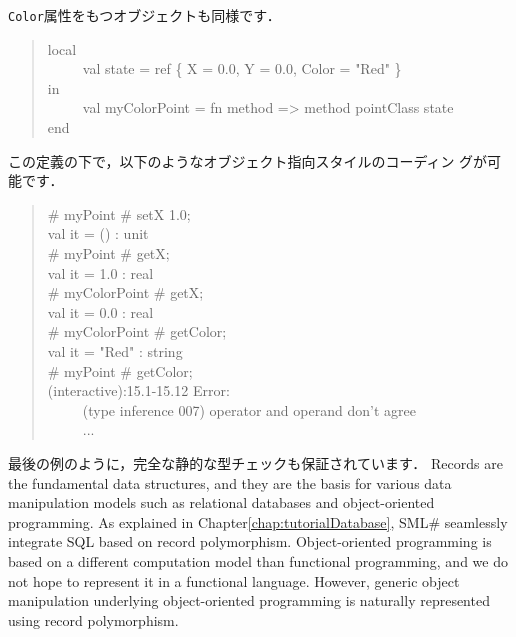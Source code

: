 \documentclass{jbook}
\newcommand{\smlsharp}{SML\#}
\newcommand{\myem}{\ \ \ \ \  }
\begin{document}
	{\tt Color}属性をもつオブジェクトも同様です．
\begin{tt}
\begin{quote}
local\\
\myem  val state =  ref \{ X = 0.0, Y = 0.0, Color = "Red" \}\\
in \\
\myem val myColorPoint = fn method => method pointClass state\\
end
\end{quote}
\end{tt}
	この定義の下で，以下のようなオブジェクト指向スタイルのコーディン
グが可能です．
\begin{tt}\begin{quote}
\# myPoint \# setX 1.0;\\
val it = () : unit\\
\# myPoint \# getX;\\
val it = 1.0 : real\\
\# myColorPoint \# getX;\\
val it = 0.0 : real\\
\# myColorPoint \# getColor;\\
val it = "Red" : string\\
\# myPoint \# getColor;\\
(interactive):15.1-15.12 Error:\\
\myem  (type inference 007) operator and operand don't agree\\
\myem ...
\end{quote}\end{tt}
	最後の例のように，完全な静的な型チェックも保証されています．
\else%
	Records are the fundamental data structures, and they are the
basis for various data manipulation models such as relational databases
and object-oriented programming.
	As explained in Chapter\ref{chap:tutorialDatabase}, 
\smlsharp{} seamlessly integrate SQL based on record polymorphism.
	Object-oriented programming is based on a different computation
model than functional programming, and we do not hope to represent it in
a functional language.
	However, generic object manipulation underlying object-oriented
programming is naturally represented using record polymorphism.
	
\end{document}
